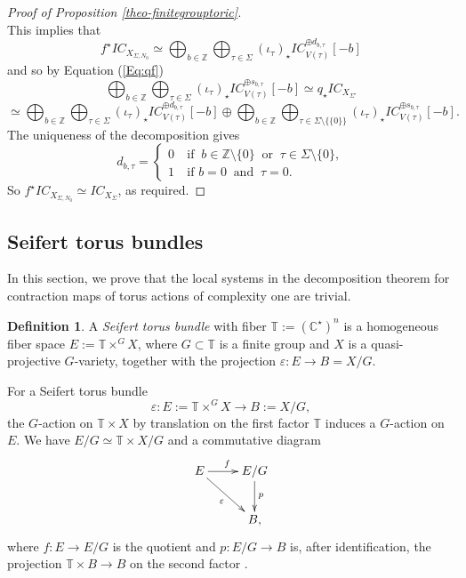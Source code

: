 \documentclass[11pt, reqno]{amsart}
\theoremstyle{plain}
\theoremstyle{definition}
\newtheorem{definition}[theorem]{Definition}
\theoremstyle{remark}
\begin{document}
\begin{proof}[Proof of Proposition \ref{theo-finitegrouptoric}]
\begin{equation}
\end{equation}
This implies that $$f^{\star} IC_{X_{\Sigma, N_{0}}} \simeq \bigoplus_{b\in \mathbb{Z}}
\bigoplus_{\tau \in \Sigma}(\iota_{\tau})_{\star}IC_{V(\tau)}^{\oplus d_{b, \tau}}[-b]$$
 and so by Equation (\ref{Eq:qf})
$$\bigoplus_{b\in \mathbb{Z}}\bigoplus_{\tau \in \Sigma}(\iota_{\tau})_{\star}IC_{V(\tau)}^{\oplus s_{b, \tau}}[-b]\simeq q_{\star} IC_{X_{\Sigma'}}$$
$$\simeq \bigoplus_{b\in \mathbb{Z}}
\bigoplus_{\tau \in \Sigma}(\iota_{\tau})_{\star}IC_{V(\tau)}^{\oplus d_{b, \tau}}[-b] \oplus \bigoplus_{b\in \mathbb{Z}}\bigoplus_{\tau\in \Sigma\setminus \{\{0\}\}}(\iota_{\tau})_{\star}IC_{V(\tau)}^{\oplus s_{b, \tau}}[-b].$$
The uniqueness of the decomposition gives
$$d_{b, \tau} = \begin{cases}
 0 & ~\text{if }~ b\in \mathbb{Z}\setminus\{0\}~ \text{ or } ~\tau\in \Sigma\setminus \{0\},\\
1 & ~\text{if } b=0 ~\text{ and }~ \tau=0.
\end{cases}$$
So $f^{\star} IC_{X_{\Sigma, N_{0}}}\simeq IC_{X_{\Sigma}}$, as required. 
\end{proof}




\subsection{Seifert torus bundles} In this section, we prove that the local systems in the decomposition theorem for contraction maps
of torus actions of complexity one are trivial.
\begin{definition}\cite[Section 2.3]{AL21}
A \emph{Seifert torus bundle} with fiber $\mathbb{T}:= (\mathbb{C}^{\star})^{n}$ is  a homogeneous fiber space 
$E:= \mathbb{T}\times^{G} X$, where $G\subset \mathbb{T}$ 
is a finite group and $X$ is a quasi-projective $G$-variety, together with the projection $\varepsilon: E\rightarrow B = X/G$.
\end{definition}
For a Seifert torus bundle 
$$ \varepsilon: E:= \mathbb{T}\times^{G} X\rightarrow B := X/G,$$
the $G$-action on $\mathbb{T}\times X$ by translation on the first factor $\mathbb{T}$ induces a $G$-action 
on $E$. We have $E/G\simeq \mathbb{T}\times X/G$ and a commutative
diagram 
$$
\xymatrix{
E \ar[r]^{f} \ar[dr]_{\varepsilon} & E/G \ar[d]^{p} \\
 & B,
}
$$
where $f: E\rightarrow E/G$ is the quotient and $p: E/G \rightarrow B$ is, after identification, 
the projection $\mathbb{T}\times B\rightarrow B$ on the second factor \cite[Lemma 2.7]{AL21}. 
\\
\end{document}
